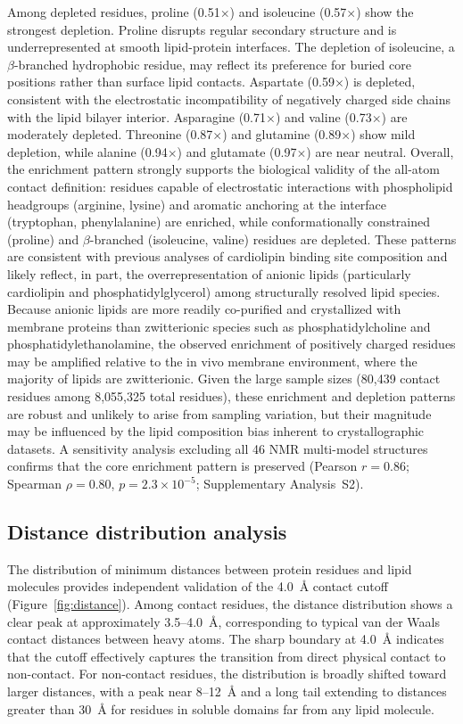 \documentclass[unnumsec,webpdf,contemporary,large]{oup-authoring-template}
\begin{document}
Among depleted residues, proline (0.51$\times$) and isoleucine (0.57$\times$) show the strongest depletion. Proline disrupts regular secondary structure and is underrepresented at smooth lipid-protein interfaces. The depletion of isoleucine, a $\beta$-branched hydrophobic residue, may reflect its preference for buried core positions rather than surface lipid contacts. Aspartate (0.59$\times$) is depleted, consistent with the electrostatic incompatibility of negatively charged side chains with the lipid bilayer interior. Asparagine (0.71$\times$) and valine (0.73$\times$) are moderately depleted. Threonine (0.87$\times$) and glutamine (0.89$\times$) show mild depletion, while alanine (0.94$\times$) and glutamate (0.97$\times$) are near neutral. Overall, the enrichment pattern strongly supports the biological validity of the all-atom contact definition: residues capable of electrostatic interactions with phospholipid headgroups (arginine, lysine) and aromatic anchoring at the interface (tryptophan, phenylalanine) are enriched, while conformationally constrained (proline) and $\beta$-branched (isoleucine, valine) residues are depleted. These patterns are consistent with previous analyses of cardiolipin binding site composition \cite{cdlbinding2021} and likely reflect, in part, the overrepresentation of anionic lipids (particularly cardiolipin and phosphatidylglycerol) among structurally resolved lipid species. Because anionic lipids are more readily co-purified and crystallized with membrane proteins than zwitterionic species such as phosphatidylcholine and phosphatidylethanolamine, the observed enrichment of positively charged residues may be amplified relative to the in vivo membrane environment, where the majority of lipids are zwitterionic. Given the large sample sizes (80,439 contact residues among 8,055,325 total residues), these enrichment and depletion patterns are robust and unlikely to arise from sampling variation, but their magnitude may be influenced by the lipid composition bias inherent to crystallographic datasets. A sensitivity analysis excluding all 46 NMR multi-model structures confirms that the core enrichment pattern is preserved (Pearson $r = 0.86$; Spearman $\rho = 0.80$, $p = 2.3 \times 10^{-5}$; Supplementary Analysis~S2).

\subsection{Distance distribution analysis}

The distribution of minimum distances between protein residues and lipid molecules provides independent validation of the 4.0~\AA{} contact cutoff (Figure~\ref{fig:distance}). Among contact residues, the distance distribution shows a clear peak at approximately 3.5--4.0~\AA{}, corresponding to typical van der Waals contact distances between heavy atoms. The sharp boundary at 4.0~\AA{} indicates that the cutoff effectively captures the transition from direct physical contact to non-contact. For non-contact residues, the distribution is broadly shifted toward larger distances, with a peak near 8--12~\AA{} and a long tail extending to distances greater than 30~\AA{} for residues in soluble domains far from any lipid molecule.
\end{document}
